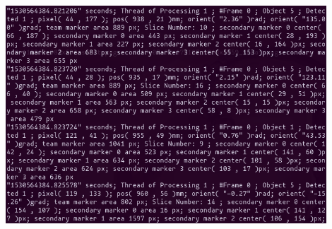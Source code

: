 \documentclass[11pt,a4paper,spanish]{beamer}
\begin{document}
\begin{frame}

	\includegraphics[width=0.9\textwidth]{img/screen.png}

\end{frame}

\setcounter{page}{34}




\end{document}
